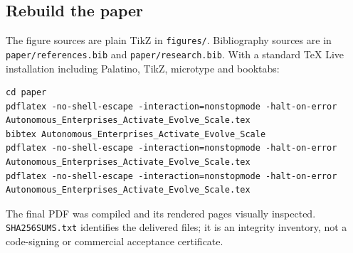 \documentclass[11pt,letterpaper]{article}
\begin{document}
\subsection{Rebuild the paper}
The figure sources are plain TikZ in \texttt{figures/\allowbreak{}}. Bibliography sources are in \texttt{paper/\allowbreak{}references.\allowbreak{}bib} and \texttt{paper/\allowbreak{}research.\allowbreak{}bib}. With a standard TeX Live installation including Palatino, TikZ, microtype and booktabs:
\begin{lstlisting}
cd paper
pdflatex -no-shell-escape -interaction=nonstopmode -halt-on-error Autonomous_Enterprises_Activate_Evolve_Scale.tex
bibtex Autonomous_Enterprises_Activate_Evolve_Scale
pdflatex -no-shell-escape -interaction=nonstopmode -halt-on-error Autonomous_Enterprises_Activate_Evolve_Scale.tex
pdflatex -no-shell-escape -interaction=nonstopmode -halt-on-error Autonomous_Enterprises_Activate_Evolve_Scale.tex
\end{lstlisting}
The final PDF was compiled and its rendered pages visually inspected. \texttt{SHA256SUMS.\allowbreak{}txt} identifies the delivered files; it is an integrity inventory, not a code-signing or commercial acceptance certificate.

\end{document}
